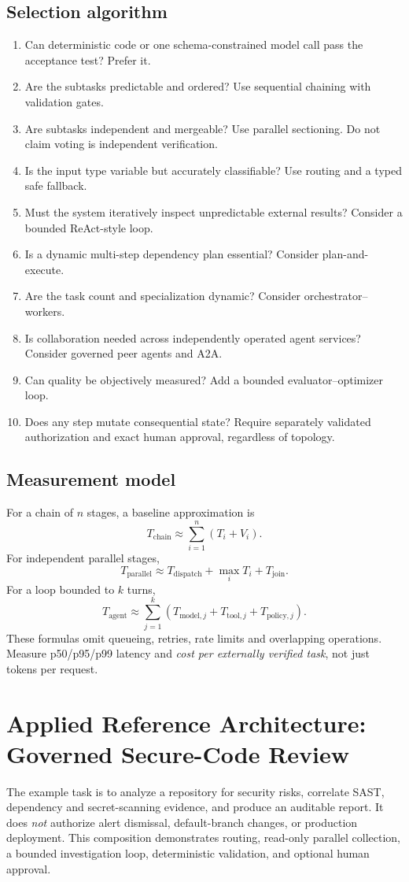 \subsection{Selection algorithm}
\begin{enumerate}
\item Can deterministic code or one schema-constrained model call pass the acceptance test? Prefer it.
\item Are the subtasks predictable and ordered? Use sequential chaining with validation gates.
\item Are subtasks independent and mergeable? Use parallel sectioning. Do not claim voting is independent verification.
\item Is the input type variable but accurately classifiable? Use routing and a typed safe fallback.
\item Must the system iteratively inspect unpredictable external results? Consider a bounded ReAct-style loop.
\item Is a dynamic multi-step dependency plan essential? Consider plan-and-execute.
\item Are the task count and specialization dynamic? Consider orchestrator--workers.
\item Is collaboration needed across independently operated agent services? Consider governed peer agents and A2A.
\item Can quality be objectively measured? Add a bounded evaluator--optimizer loop.
\item Does any step mutate consequential state? Require separately validated authorization and exact human approval, regardless of topology.
\end{enumerate}

\subsection{Measurement model}
For a chain of $n$ stages, a baseline approximation is
\[
 T_{\mathrm{chain}} \approx \sum_{i=1}^{n}(T_i+V_i).
\]
For independent parallel stages,
\[
 T_{\mathrm{parallel}}\approx T_{\mathrm{dispatch}}+\max_i T_i+T_{\mathrm{join}}.
\]
For a loop bounded to $k$ turns,
\[
 T_{\mathrm{agent}}\approx\sum_{j=1}^{k}
 (T_{\mathrm{model},j}+T_{\mathrm{tool},j}+T_{\mathrm{policy},j}).
\]
These formulas omit queueing, retries, rate limits and overlapping operations. Measure p50/p95/p99 latency and \emph{cost per externally verified task}, not just tokens per request.

\section{Applied Reference Architecture: Governed Secure-Code Review}
The example task is to analyze a repository for security risks, correlate SAST, dependency and secret-scanning evidence, and produce an auditable report. It does \emph{not} authorize alert dismissal, default-branch changes, or production deployment. This composition demonstrates routing, read-only parallel collection, a bounded investigation loop, deterministic validation, and optional human approval.

